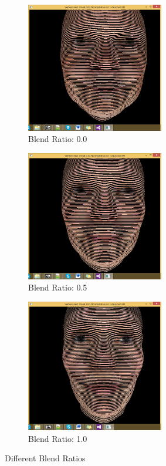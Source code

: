 \begin{figure}
        \centering
        \begin{subfigure}[b]{0.3\textwidth}
                \includegraphics[width=6cm]{../Screenshots/ex-3/1-1.png}
                \caption{Blend Ratio: 0.0}
                \label{fig:3-1-1}
        \end{subfigure}
        
        \begin{subfigure}[b]{0.3\textwidth}
                \includegraphics[width=6cm]{../Screenshots/ex-3/1-2.png}
                \caption{Blend Ratio: 0.5}
                \label{fig:3-1-2}
        \end{subfigure}
        
        \begin{subfigure}[b]{0.3\textwidth}
                \includegraphics[width=6cm]{../Screenshots/ex-3/1-3.png}
                \caption{Blend Ratio: 1.0}
                \label{fig:3-1-3}
        \end{subfigure}
        \caption{Different Blend Ratios}\label{fig:3-1}
\end{figure}



